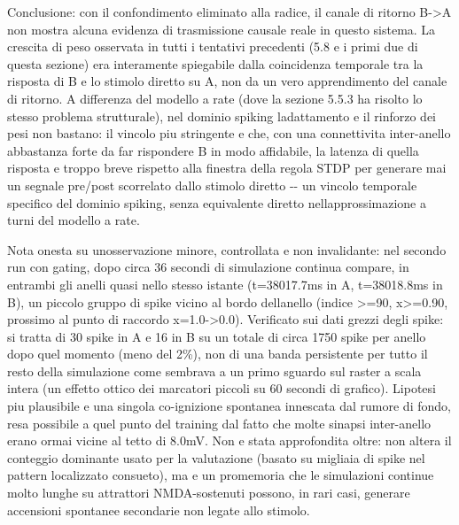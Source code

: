 \documentclass[
  italian,
]{article}
\begin{document}
Conclusione: con il confondimento eliminato alla radice, il canale di ritorno B-\textgreater A non mostra alcuna evidenza di trasmissione causale reale in questo sistema. La crescita di peso osservata in tutti i tentativi precedenti (5.8 e i primi due di questa sezione) era interamente spiegabile dalla coincidenza temporale tra la risposta di B e lo stimolo diretto su A, non da un vero apprendimento del canale di ritorno. A differenza del modello a rate (dove la sezione 5.5.3 ha risolto lo stesso problema strutturale), nel dominio spiking l\textquotesingle adattamento e il rinforzo dei pesi non bastano: il vincolo piu\textquotesingle{} stringente e\textquotesingle{} che, con una connettivita\textquotesingle{} inter-anello abbastanza forte da far rispondere B in modo affidabile, la latenza di quella risposta e\textquotesingle{} troppo breve rispetto alla finestra della regola STDP per generare mai un segnale pre/post scorrelato dallo stimolo diretto -\/- un vincolo temporale specifico del dominio spiking, senza equivalente diretto nell\textquotesingle approssimazione a turni del modello a rate.

Nota onesta su un\textquotesingle osservazione minore, controllata e non invalidante: nel secondo run con gating, dopo circa 36 secondi di simulazione continua compare, in entrambi gli anelli quasi nello stesso istante (t=38017.7ms in A, t=38018.8ms in B), un piccolo gruppo di spike vicino al bordo dell\textquotesingle anello (indice \textgreater=90, x\textgreater=0.90, prossimo al punto di raccordo x=1.0-\textgreater0.0). Verificato sui dati grezzi degli spike: si tratta di 30 spike in A e 16 in B su un totale di circa 1750 spike per anello dopo quel momento (meno del 2\%), non di una banda persistente per tutto il resto della simulazione come sembrava a un primo sguardo sul raster a scala intera (un effetto ottico dei marcatori piccoli su 60 secondi di grafico). L\textquotesingle ipotesi piu\textquotesingle{} plausibile e\textquotesingle{} una singola co-ignizione spontanea innescata dal rumore di fondo, resa possibile a quel punto del training dal fatto che molte sinapsi inter-anello erano ormai vicine al tetto di 8.0mV. Non e\textquotesingle{} stata approfondita oltre: non altera il conteggio dominante usato per la valutazione (basato su migliaia di spike nel pattern localizzato consueto), ma e\textquotesingle{} un promemoria che le simulazioni continue molto lunghe su attrattori NMDA-sostenuti possono, in rari casi, generare accensioni spontanee secondarie non legate allo stimolo.
\end{document}
